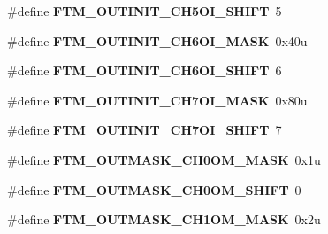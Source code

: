 \begin{DoxyCompactItemize}
\item 
\#define {\bfseries F\+T\+M\+\_\+\+O\+U\+T\+I\+N\+I\+T\+\_\+\+C\+H5\+O\+I\+\_\+\+S\+H\+I\+FT}~5\hypertarget{group__FTM__Register__Masks_ga7a284efce0663f9bde85b1efc1b1cfd3}{}\label{group__FTM__Register__Masks_ga7a284efce0663f9bde85b1efc1b1cfd3}

\item 
\#define {\bfseries F\+T\+M\+\_\+\+O\+U\+T\+I\+N\+I\+T\+\_\+\+C\+H6\+O\+I\+\_\+\+M\+A\+SK}~0x40u\hypertarget{group__FTM__Register__Masks_ga4140f95c3774bb113eba65b099673d64}{}\label{group__FTM__Register__Masks_ga4140f95c3774bb113eba65b099673d64}

\item 
\#define {\bfseries F\+T\+M\+\_\+\+O\+U\+T\+I\+N\+I\+T\+\_\+\+C\+H6\+O\+I\+\_\+\+S\+H\+I\+FT}~6\hypertarget{group__FTM__Register__Masks_gae1269df4b4b0084a0e722e688c98abe0}{}\label{group__FTM__Register__Masks_gae1269df4b4b0084a0e722e688c98abe0}

\item 
\#define {\bfseries F\+T\+M\+\_\+\+O\+U\+T\+I\+N\+I\+T\+\_\+\+C\+H7\+O\+I\+\_\+\+M\+A\+SK}~0x80u\hypertarget{group__FTM__Register__Masks_ga04c56da93774326348a87fb79211e421}{}\label{group__FTM__Register__Masks_ga04c56da93774326348a87fb79211e421}

\item 
\#define {\bfseries F\+T\+M\+\_\+\+O\+U\+T\+I\+N\+I\+T\+\_\+\+C\+H7\+O\+I\+\_\+\+S\+H\+I\+FT}~7\hypertarget{group__FTM__Register__Masks_ga717e3d932a491d96e6d729ff87e7c0dd}{}\label{group__FTM__Register__Masks_ga717e3d932a491d96e6d729ff87e7c0dd}

\item 
\#define {\bfseries F\+T\+M\+\_\+\+O\+U\+T\+M\+A\+S\+K\+\_\+\+C\+H0\+O\+M\+\_\+\+M\+A\+SK}~0x1u\hypertarget{group__FTM__Register__Masks_gae1ed080952e4ddf3947066d5d97b7920}{}\label{group__FTM__Register__Masks_gae1ed080952e4ddf3947066d5d97b7920}

\item 
\#define {\bfseries F\+T\+M\+\_\+\+O\+U\+T\+M\+A\+S\+K\+\_\+\+C\+H0\+O\+M\+\_\+\+S\+H\+I\+FT}~0\hypertarget{group__FTM__Register__Masks_gaae1f8ee6cad97accdeef238387cd160c}{}\label{group__FTM__Register__Masks_gaae1f8ee6cad97accdeef238387cd160c}

\item 
\#define {\bfseries F\+T\+M\+\_\+\+O\+U\+T\+M\+A\+S\+K\+\_\+\+C\+H1\+O\+M\+\_\+\+M\+A\+SK}~0x2u\hypertarget{group__FTM__Register__Masks_gaddee400c7d6e8dca5d318526d6e9cf0c}{}\label{group__FTM__Register__Masks_gaddee400c7d6e8dca5d318526d6e9cf0c}


\end{DoxyCompactItemize}

